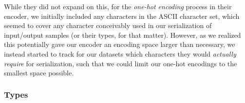 \documentclass{article}
\begin{document}
    While they did not expand on this,
    for the \emph{one-hot encoding} process in their encoder,
    we initially included any characters in the ASCII character set,
    which seemed to cover any character conceivably used in our serialization of input/output samples (or their types, for that matter).
    However, as we realized this potentially gave our encoder an encoding space larger than necessary,
    we instead started to track for our datasets which characters they would \emph{actually require} for serialization,
    such that we could limit our one-hot encodings to the smallest space possible.

\subsubsection{Types} \label{sec:typednsps}

\end{document}
